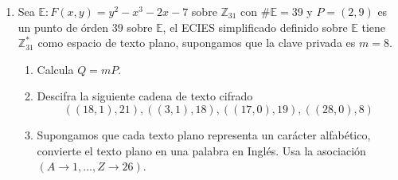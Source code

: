 \documentclass[letterpaper,11pt]{article}
\begin{document}
\begin{enumerate}
    \item Sea $\mathbb{E} : F(x, y) = y^2 - x^3 - 2x - 7$ sobre 
    $\mathbb{Z}_{31}$ con $\# \mathbb{E} = 39$ y $P = (2, 9)$ es un punto de 
    órden $39$ sobre $\mathbb{E}$, el \textsc{ECIES} simplificado definido sobre 
    $\mathbb{E}$ tiene $\mathbb{Z}^{*}_{31}$ como espacio de texto plano, 
    supongamos que la clave privada es $m = 8$. 
    \begin{enumerate}
        \item Calcula $Q = mP$.
        \item Descifra la siguiente cadena de texto cifrado 
        \begin{equation*}
            ((18, 1), 21), ((3, 1), 18), ((17, 0), 19), ((28, 0), 8)
        \end{equation*}
        \item Supongamos que cada texto plano representa un carácter alfabético,
        convierte el texto plano en una palabra en Inglés. Usa la asociación 
        $(A \rightarrow 1, ..., Z \rightarrow 26)$.
    \end{enumerate}
\end{enumerate}
\end{document}
